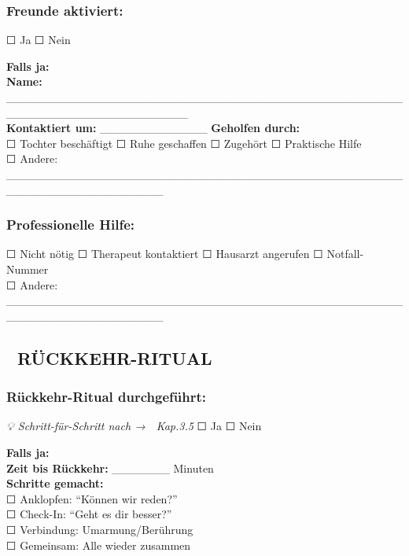 \hypertarget{freunde-aktiviert}{%
\subsubsection{\texorpdfstring{\textbf{Freunde aktiviert:}}{Freunde aktiviert:}}\label{freunde-aktiviert}}

☐ Ja ☐ Nein

\textbf{Falls ja:}\\
\textbf{Name:} \_\_\_\_\_\_\_\_\_\_\_\_\_\_\_\_\_\_\_\_\_\_\_\_\_\_\_\_\_\_\_\_\_\_\_\_\_\_\_\_\_\_\_\_\_\_\_\_\_\_\_\_\_\_\_\_\_\_\_\_\_\_\_\_\_\_\_\_\_\_\\
\textbf{Kontaktiert um:} \_\_\_\_\_\_\_\_\_\_\_\_\_ \textbf{Geholfen durch:}\\
☐ Tochter beschäftigt ☐ Ruhe geschaffen ☐ Zugehört ☐ Praktische Hilfe\\
☐ Andere: \_\_\_\_\_\_\_\_\_\_\_\_\_\_\_\_\_\_\_\_\_\_\_\_\_\_\_\_\_\_\_\_\_\_\_\_\_\_\_\_\_\_\_\_\_\_\_\_\_\_\_\_\_\_\_\_\_\_\_\_\_\_\_\_\_\_\_

\hypertarget{professionelle-hilfe}{%
\subsubsection{\texorpdfstring{\textbf{Professionelle Hilfe:}}{Professionelle Hilfe:}}\label{professionelle-hilfe}}

☐ Nicht nötig ☐ Therapeut kontaktiert ☐ Hausarzt angerufen ☐ Notfall-Nummer\\
☐ Andere: \_\_\_\_\_\_\_\_\_\_\_\_\_\_\_\_\_\_\_\_\_\_\_\_\_\_\_\_\_\_\_\_\_\_\_\_\_\_\_\_\_\_\_\_\_\_\_\_\_\_\_\_\_\_\_\_\_\_\_\_\_\_\_\_\_\_\_

\hypertarget{ruxfcckkehr-ritual}{%
\subsection{\texorpdfstring{\textbf{🔄 RÜCKKEHR-RITUAL}}{🔄 RÜCKKEHR-RITUAL}}\label{ruxfcckkehr-ritual}}

\hypertarget{ruxfcckkehr-ritual-durchgefuxfchrt}{%
\subsubsection{\texorpdfstring{\textbf{Rückkehr-Ritual durchgeführt:}}{Rückkehr-Ritual durchgeführt:}}\label{ruxfcckkehr-ritual-durchgefuxfchrt}}

\emph{💡 Schritt-für-Schritt nach → 🔴 Kap.3.5} ☐ Ja ☐ Nein

\textbf{Falls ja:}\\
\textbf{Zeit bis Rückkehr:} \_\_\_\_\_\_\_ Minuten\\
\textbf{Schritte gemacht:}\\
☐ Anklopfen: ``Können wir reden?''\\
☐ Check-In: ``Geht es dir besser?''\\
☐ Verbindung: Umarmung/Berührung\\
☐ Gemeinsam: Alle wieder zusammen

